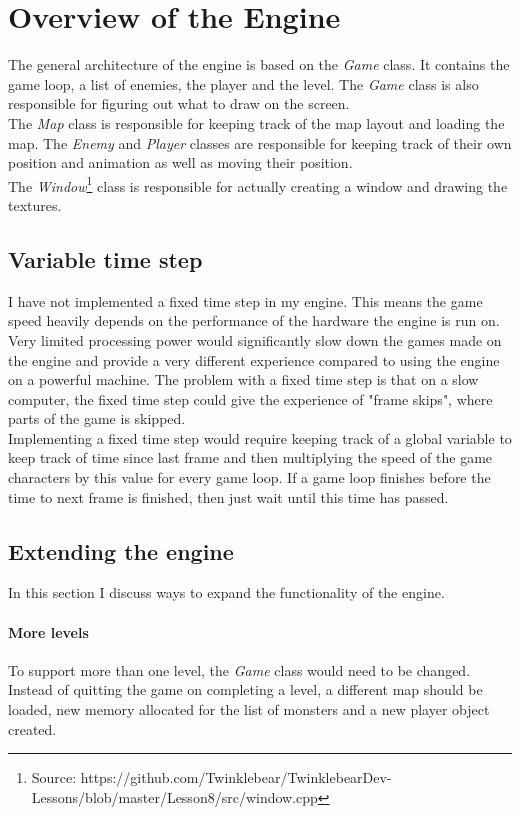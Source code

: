 \section{Overview of the Engine}
The general architecture of the engine is based on the \textit{Game} class. It contains the game loop, a list of enemies, the player  and the level. The \textit{Game} class is also responsible for figuring out what to draw on the screen.
\\The \textit{Map} class is responsible for keeping track of the map layout and loading the map. The \textit{Enemy} and \textit{Player} classes are responsible for keeping track of their own position and animation as well as moving their position.
\\The \textit{Window}\footnote{Source: https://github.com/Twinklebear/TwinklebearDev-Lessons/blob/master/Lesson8/src/window.cpp} class is responsible for actually creating a window and drawing the textures.

\subsection{Variable time step}
\label{overview_timestep}
I have not implemented a fixed time step in my engine. This means the game speed heavily depends on the performance of the hardware the engine is run on. Very limited processing power would significantly slow down the games made on the engine and provide a very different experience compared to using the engine on a powerful machine. The problem with a fixed time step is that on a slow computer, the fixed time step could give the experience of "frame skips", where parts of the game is skipped.
\\Implementing a fixed time step would require keeping track of a global variable to keep track of time since last frame and then multiplying the speed of the game characters by this value for every game loop. If a game loop finishes before the time to next frame is finished, then just wait until this time has passed.

\subsection{Extending the engine}
\label{overview_extending}
In this section I discuss ways to expand the functionality of the engine.
\paragraph{More levels}
To support more than one level, the \textit{Game} class would need to be changed. Instead of quitting the game on completing a level, a different map should be loaded, new memory allocated  for the list of monsters and a new player object created.
